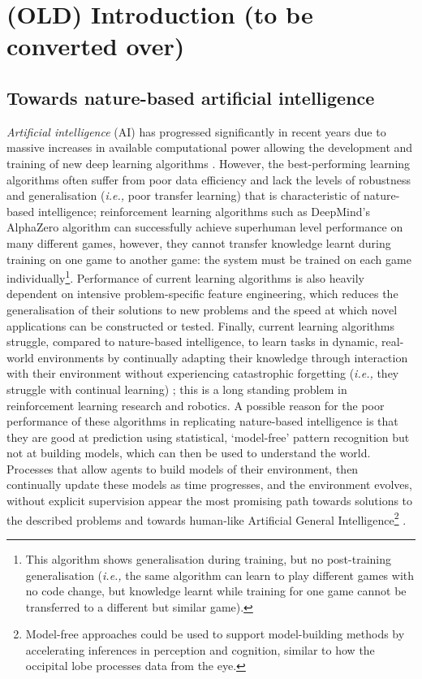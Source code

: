 \chapter{
(OLD) Introduction (to be converted over)
}\label{chp:Introduction}
\section{Towards nature-based artificial intelligence}

\textit{Artificial intelligence} (AI) has progressed significantly in recent years due to massive increases in available computational power allowing the development and training of new deep learning algorithms \autocite{Amodei2018}.
However, the best-performing learning algorithms often suffer from poor data efficiency and lack the levels of robustness and generalisation (\textit{i.e.,} poor transfer learning) that is characteristic of nature-based intelligence; reinforcement learning algorithms such as DeepMind’s AlphaZero algorithm \autocite{Silver2017a, Silver2017b} can successfully achieve superhuman level performance on many different games, however, they cannot transfer knowledge learnt during training on one game to another game: the system must be trained on each game individually\footnote{This algorithm shows generalisation during training, but no post-training generalisation (\textit{i.e.,} the same algorithm can learn to play different games with no code change, but knowledge learnt while training for one game cannot be transferred to a different but similar game).}.
Performance of current learning algorithms is also heavily dependent on intensive problem-specific feature engineering, which reduces the generalisation of their solutions to new problems and the speed at which novel applications can be constructed or tested.
Finally, current learning algorithms struggle, compared to nature-based intelligence, to learn tasks in dynamic, real-world environments by continually adapting their knowledge through interaction with their environment without experiencing catastrophic forgetting (\textit{i.e.,} they struggle with continual learning) \autocite{Sauders2018}; this is a long standing problem in reinforcement learning research and robotics.
A possible reason for the poor performance of these algorithms in replicating nature-based intelligence is that they are good at prediction using statistical, ‘model-free’ pattern recognition but not at building models, which can then be used to understand the world.
Processes that allow agents to build models of their environment, then continually update these models as time progresses, and the environment evolves, without explicit supervision appear the most promising path towards solutions to the described problems and towards human-like Artificial General Intelligence\footnote{Model-free approaches could be used to support model-building methods by accelerating inferences in perception and cognition, similar to how the occipital lobe processes data from the eye.} \autocite{Lake2017, Bengio2013}.

